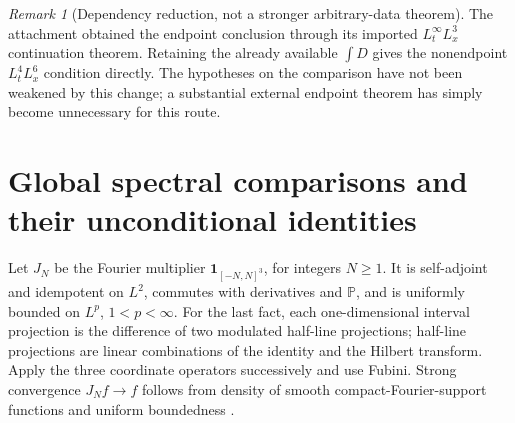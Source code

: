 \documentclass[11pt,a4paper]{article}
\theoremstyle{definition}\newtheorem{definition}[theorem]{Definition}
\theoremstyle{remark}\newtheorem{remark}[theorem]{Remark}
\newcommand{\PP}{\mathbb P}
\numberwithin{equation}{section}
\begin{document}
\begin{remark}[Dependency reduction, not a stronger arbitrary-data theorem]
The attachment obtained the endpoint conclusion through its imported $L^\infty_tL^3_x$ continuation theorem. Retaining the already available $\int D$ gives the nonendpoint $L^4_tL^6_x$ condition directly. The hypotheses on the comparison have not been weakened by this change; a substantial external endpoint theorem has simply become unnecessary for this route.
\end{remark}

\section{Global spectral comparisons and their unconditional identities}
\label{sec:spectral}
Let $J_N$ be the Fourier multiplier $\mathbf1_{[-N,N]^3}$, for integers $N\ge1$. It is self-adjoint and idempotent on $L^2$, commutes with derivatives and $\PP$, and is uniformly bounded on $L^p$, $1<p<\infty$. For the last fact, each one-dimensional interval projection is the difference of two modulated half-line projections; half-line projections are linear combinations of the identity and the Hilbert transform. Apply the three coordinate operators successively and use Fubini. Strong convergence $J_Nf\to f$ follows from density of smooth compact-Fourier-support functions and uniform boundedness \cite{Stein}.
\end{document}
